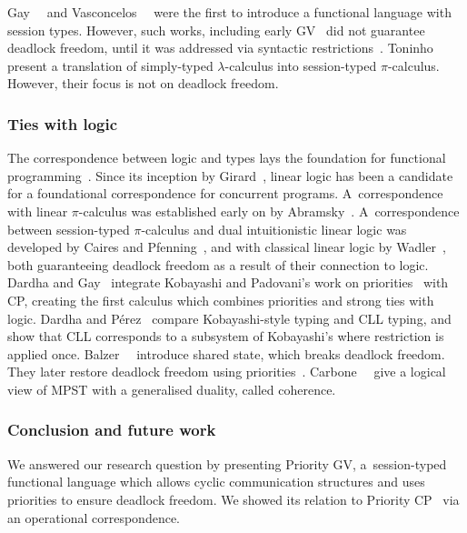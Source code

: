 \documentclass[main.tex]{subfiles}
\begin{document}
Gay~\etal~\cite{gaynagarajan03} and Vasconcelos~\etal~\cite{vasconcelosravara04,vasconcelosgay06} were the first to introduce a functional language with session types. However, such works, including early GV~\cite{gayvasconcelos10,gayvasconcelos12} did not guarantee deadlock freedom, until it was addressed via syntactic restrictions~\cite{lindleymorris15,wadler14}. Toninho~\etal~\cite{toninhocaires12} present a translation of simply-typed $\lambda$-calculus into session-typed $\pi$-calculus. However, their focus is not on deadlock freedom.

\subsubsection*{Ties with logic}
The correspondence between logic and types lays the foundation for functional programming~\cite{wadler15}. Since its inception by Girard~\cite{girard87}, linear logic has been a candidate for a foundational correspondence for concurrent programs. A~correspondence with linear $\pi$-calculus was established early on by Abramsky~\cite{abramsky94,bellinscott94}. A~correspondence between session-typed $\pi$-calculus and dual intuitionistic linear logic was developed by Caires and Pfenning~\cite[$\pi\text{DILL}$]{cairespfenning10}, and with classical linear logic by Wadler~\cite[CP]{wadler15}, both guaranteeing deadlock freedom as a result of their connection to logic. Dardha and Gay~\cite[PCP]{dardhagay18} integrate Kobayashi and Padovani's work on priorities~\cite{kobayashi06,padovani14} with CP, creating the first calculus which combines priorities and strong ties with logic. Dardha and P\'{e}rez~\cite{dardhaperez15} compare Kobayashi-style typing and CLL typing, and show that CLL corresponds to a subsystem of Kobayashi's where restriction is applied once. Balzer~\etal~\cite[$\text{SILL}_S$]{balzerpfenning17} introduce shared state, which breaks deadlock freedom. They later restore deadlock freedom using priorities~\cite[$\text{SILL}_{S+}$]{balzertoninho19}.
Carbone~\etal~\cite{carbonelindley16} give a logical view of MPST with a generalised duality, called coherence.

\subsubsection*{Conclusion and future work}
We answered our research question by presenting Priority GV, a~session-typed functional language which allows cyclic communication structures and uses priorities to ensure deadlock freedom. We showed its relation to Priority CP~\cite{dardhagay18} via an operational correspondence.
\end{document}

